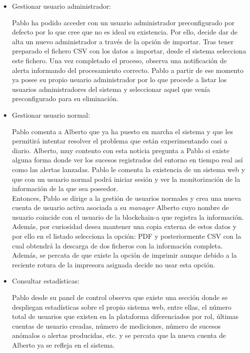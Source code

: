 \documentclass[12pt,a4paper, twoside]{report}
\begin{document}
\begin{itemize}
		\item Gestionar usuario administrador:
		
		Pablo ha podido acceder con un usuario administrador preconfigurado por defecto por lo que cree que no es ideal su existencia. Por ello, decide dar de alta un nuevo administrador a través de la opción de importar. Tras tener preparado el fichero CSV con los datos a importar, desde el sistema selecciona este fichero. Una vez completado el proceso, observa una notificación de alerta informando del procesamiento correcto. Pablo a partir de ese momento ya posee su propio usuario administrador por lo que procede a listar los usuarios administradores del sistema y seleccionar aquel que venía preconfigurado para su eliminación.
					
		\item Gestionar usuario normal:
		
		Pablo comenta a Alberto que ya ha puesto en marcha el sistema y que les permitirá intentar resolver el problema que están experimentando casi a diario. Alberto, muy contento con esta noticia pregunta a Pablo si existe alguna forma donde ver los sucesos registrados del entorno en tiempo real así como las alertas lanzadas. Pablo le comenta la existencia de un sistema web y que con un usuario normal podrá iniciar sesión y ver la monitorización de la información de la que sea poseedor. \\
		
		Entonces, Pablo se dirige a la gestión de usuarios normales y crea una nueva cuenta de usuario activa asociada a su \textit{manager} Alberto cuyo nombre de usuario coincide con el usuario de la \gls{blockchain-a} que registra la información. Además, por curiosidad desea mantener una copia externa de estos datos y por ello en el listado selecciona la opción: PDF y posteriormente CSV con la cual obtendrá la descarga de dos ficheros con la información completa. Además, se percata de que existe la opción de imprimir aunque debido a la reciente rotura de la impresora asignada decide no usar esta opción.
		
		\item Consultar estadísticas:
		
		Pablo desde su panel de control observa que existe una sección donde se despliegan estadísticas sobre el propio sistema web, entre ellas, el número total de usuarios que existen en la plataforma diferenciados por rol, últimas cuentas de usuario creadas, número de mediciones, número de sucesos anómalos o alertas producidas, etc. y se percata que la nueva cuenta de Alberto ya se refleja en el sistema.
		

\end{itemize}
\end{document}
